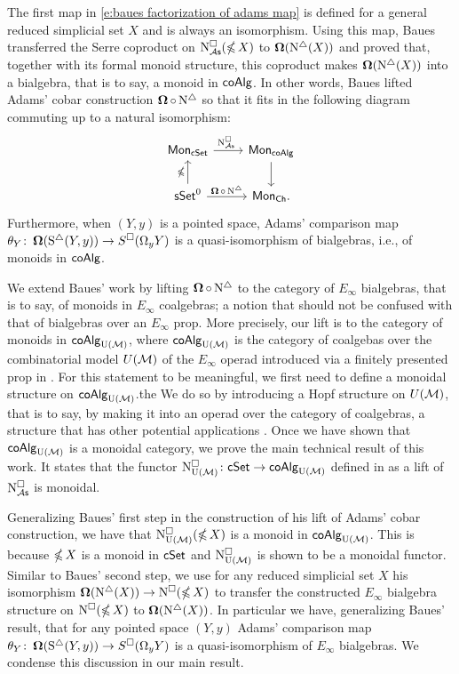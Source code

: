 The first map in \eqref{e:baues factorization of adams map} is defined for a general reduced simplicial set $X$ and is always an isomorphism.
Using this map, Baues transferred the Serre coproduct on $\operatorname{N^{\square}_{\mathcal{A}\mathsf{s}}}(\operatorname{\mathbb{\Omega}} X)$ to $\operatorname{\mathbf{\Omega}}(\operatorname{N^{\triangle}}(X))$ and proved that, together with its formal monoid structure, this coproduct makes $\operatorname{\mathbf{\Omega}}(\operatorname{N^{\triangle}}(X))$ into a bialgebra, that is to say, a monoid in $\mathsf{coAlg}$.
In other words, Baues lifted Adams' cobar construction $\operatorname{\mathbf{\Omega}} \circ \operatorname{N^{\triangle}}$ so that it fits in the following diagram commuting up to a natural isomorphism:
\begin{equation*}
\begin{tikzcd}
\Mon_{\cSet} \arrow[r, "\cchainsAS \ "] & \Mon_{\coAlg} \arrow[d] \\
\sSet^0 \arrow[r, "\cobar \circ \schains"] \arrow[u, "\ccobar"] & \Mon_{\Ch}.
\end{tikzcd}
\end{equation*}
Furthermore, when $(Y, y)$ is a pointed space, Adams' comparison map $\theta_Y \colon \operatorname{\mathbf{\Omega}}(\operatorname{S^{\triangle}}(Y, y)) \to S^{\square}(\Omega_y Y)$ is a quasi-isomorphism of bialgebras, i.e., of monoids in $\mathsf{coAlg}$.

We extend Baues' work by lifting $\operatorname{\mathbf{\Omega}} \circ \operatorname{N^{\triangle}}$ to the category of $E_\infty$ bialgebras, that is to say, of monoids in $E_\infty$ coalgebras; a notion that should not be confused with that of bialgebras over an $E_\infty$ prop.
More precisely, our lift is to the category of monoids in $\mathsf{coAlg}_{\operatorname{U}(\mathcal{M})}$, where $\mathsf{coAlg}_{\operatorname{U}(\mathcal{M})}$ is the category of coalgebas over the combinatorial model $U(\mathcal{M})$ of the $E_\infty$ operad introduced via a finitely presented prop in \cite{medina2020prop1}.
For this statement to be meaningful, we first need to define a monoidal structure on $\mathsf{coAlg}_{\operatorname{U}(\mathcal{M})}$.the
We do so by introducing a Hopf structure on $U(\mathcal{M})$, that is to say, by making it into an operad over the category of coalgebras, a structure that has other potential applications \cite{livernet2008hopf}.
Once we have shown that $\mathsf{coAlg}_{\operatorname{U}(\mathcal{M})}$ is a monoidal category, we prove the main technical result of this work.
It states that the functor $\operatorname{N^{\square}_{{\operatorname{U}(\mathcal{M})}}} \colon \mathsf{cSet} \to \mathsf{coAlg}_{\operatorname{U}(\mathcal{M})}$ defined in \cite{medina2021cubical} as a lift of $\operatorname{N^{\square}_{\mathcal{A}\mathsf{s}}}$ is monoidal.

Generalizing Baues' first step in the construction of his lift of Adams' cobar construction, we have that $\operatorname{N^{\square}_{{\operatorname{U}(\mathcal{M})}}}(\operatorname{\mathbb{\Omega}} X)$ is a monoid in $\mathsf{coAlg}_{\operatorname{U}(\mathcal{M})}$.
This is because $\operatorname{\mathbb{\Omega}} X$ is a monoid in $\mathsf{cSet}$ and $\operatorname{N^{\square}_{{\operatorname{U}(\mathcal{M})}}}$ is shown to be a monoidal functor.
Similar to Baues' second step, we use for any reduced simplicial set $X$ his isomorphism $\operatorname{\mathbf{\Omega}}(\operatorname{N^{\triangle}}(X)) \to \operatorname{N^{\square}}(\operatorname{\mathbb{\Omega}} X)$ to transfer the constructed $E_\infty$ bialgebra structure on $\operatorname{N^{\square}}(\operatorname{\mathbb{\Omega}} X)$ to $\operatorname{\mathbf{\Omega}}(\operatorname{N^{\triangle}}(X))$.
In particular we have, generalizing Baues' result, that for any pointed space $(Y, y)$ Adams' comparison map $\theta_Y \colon \operatorname{\mathbf{\Omega}}(\operatorname{S^{\triangle}}(Y, y)) \to S^{\square}(\Omega_y Y)$ is a quasi-isomorphism of $E_\infty$ bialgebras.
We condense this discussion in our main result.

